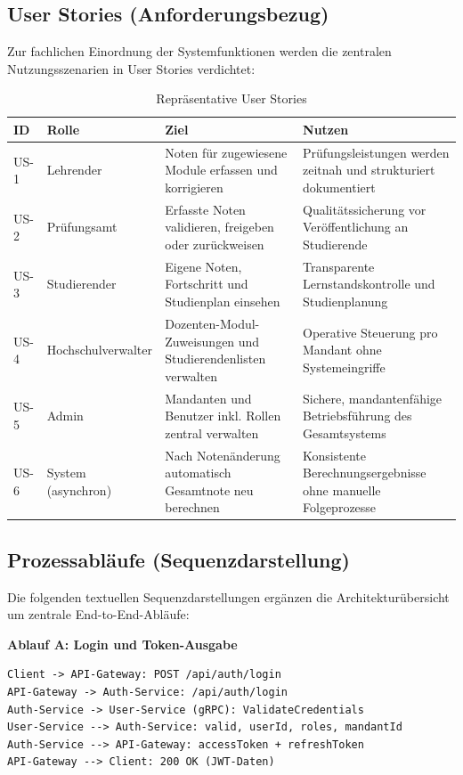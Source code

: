 \documentclass[12pt,a4paper,ngerman]{article}
\begin{document}
\subsection{User Stories (Anforderungsbezug)}

Zur fachlichen Einordnung der Systemfunktionen werden die zentralen Nutzungsszenarien in User Stories verdichtet:

\begin{table}[H]
\centering
\caption{Repräsentative User Stories}
\begin{tabular}{lL{3cm}L{4.5cm}L{4.5cm}}
\toprule
\textbf{ID} & \textbf{Rolle} & \textbf{Ziel} & \textbf{Nutzen} \\
\midrule
US-1 & Lehrender & Noten für zugewiesene Module erfassen und korrigieren & Prüfungsleistungen werden zeitnah und strukturiert dokumentiert \\
US-2 & Prüfungsamt & Erfasste Noten validieren, freigeben oder zurückweisen & Qualitätssicherung vor Veröffentlichung an Studierende \\
US-3 & Studierender & Eigene Noten, Fortschritt und Studienplan einsehen & Transparente Lernstandskontrolle und Studienplanung \\
US-4 & Hochschulverwalter & Dozenten-Modul-Zuweisungen und Studierendenlisten verwalten & Operative Steuerung pro Mandant ohne Systemeingriffe \\
US-5 & Admin & Mandanten und Benutzer inkl. Rollen zentral verwalten & Sichere, mandantenfähige Betriebsführung des Gesamtsystems \\
US-6 & System (asynchron) & Nach Notenänderung automatisch Gesamtnote neu berechnen & Konsistente Berechnungsergebnisse ohne manuelle Folgeprozesse \\
\bottomrule
\end{tabular}
\end{table}

\subsection{Prozessabläufe (Sequenzdarstellung)}

Die folgenden textuellen Sequenzdarstellungen ergänzen die Architekturübersicht um zentrale End-to-End-Abläufe:

\textbf{Ablauf A: Login und Token-Ausgabe}
\begin{lstlisting}
Client -> API-Gateway: POST /api/auth/login
API-Gateway -> Auth-Service: /api/auth/login
Auth-Service -> User-Service (gRPC): ValidateCredentials
User-Service --> Auth-Service: valid, userId, roles, mandantId
Auth-Service --> API-Gateway: accessToken + refreshToken
API-Gateway --> Client: 200 OK (JWT-Daten)
\end{lstlisting}
\end{document}
